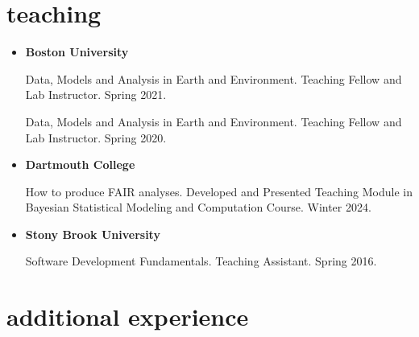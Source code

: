 \documentclass[10pt,oneside]{article}
\begin{document}

\section{teaching}

\mbox{}\vspace{-\dimexpr\baselineskip\relax}


\begin{itemize}[label={}]
  
  \item \textbf{Boston University}
        
        Data, Models and Analysis in Earth and Environment. Teaching Fellow and Lab Instructor. Spring 2021.
        
        Data, Models and Analysis in Earth and Environment. Teaching Fellow and Lab Instructor. Spring 2020.
        
        
  \item \textbf{Dartmouth College}
        
        How to produce FAIR analyses. Developed and Presented Teaching Module in Bayesian Statistical Modeling and Computation Course. Winter 2024.
        
        
  \item \textbf{Stony Brook University}
        
        Software Development Fundamentals. Teaching Assistant. Spring 2016.
        
        
\end{itemize}


\section{additional experience}

\mbox{}\vspace{-\dimexpr\baselineskip\relax}
\end{document}
